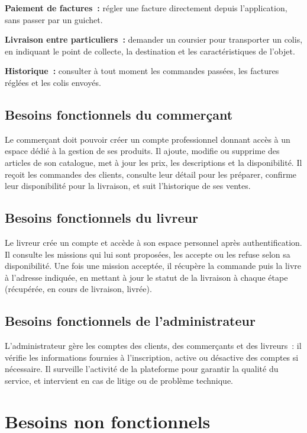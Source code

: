 \documentclass[12pt,fleqn,a4paper]{report}
\begin{document}
\begin{justify}
\vspace{0.3cm}
\textbf{Paiement de factures~:} régler une facture directement depuis l'application, sans passer par un guichet.

\vspace{0.3cm}
\textbf{Livraison entre particuliers~:} demander un coursier pour transporter un colis, en indiquant le point de collecte, la destination et les caractéristiques de l'objet.

\vspace{0.3cm}
\textbf{Historique~:} consulter à tout moment les commandes passées, les factures réglées et les colis envoyés.

\subsection{Besoins fonctionnels du commerçant}
Le commerçant doit pouvoir créer un compte professionnel donnant accès à un espace dédié à la gestion de ses produits. Il ajoute, modifie ou supprime des articles de son catalogue, met à jour les prix, les descriptions et la disponibilité. Il reçoit les commandes des clients, consulte leur détail pour les préparer, confirme leur disponibilité pour la livraison, et suit l'historique de ses ventes.

\subsection{Besoins fonctionnels du livreur}
Le livreur crée un compte et accède à son espace personnel après authentification. Il consulte les missions qui lui sont proposées, les accepte ou les refuse selon sa disponibilité. Une fois une mission acceptée, il récupère la commande puis la livre à l'adresse indiquée, en mettant à jour le statut de la livraison à chaque étape (récupérée, en cours de livraison, livrée).

\subsection{Besoins fonctionnels de l'administrateur}
L'administrateur gère les comptes des clients, des commerçants et des livreurs~: il vérifie les informations fournies à l'inscription, active ou désactive des comptes si nécessaire. Il surveille l'activité de la plateforme pour garantir la qualité du service, et intervient en cas de litige ou de problème technique.

\section{Besoins non fonctionnels}


\end{justify}
\end{document}

